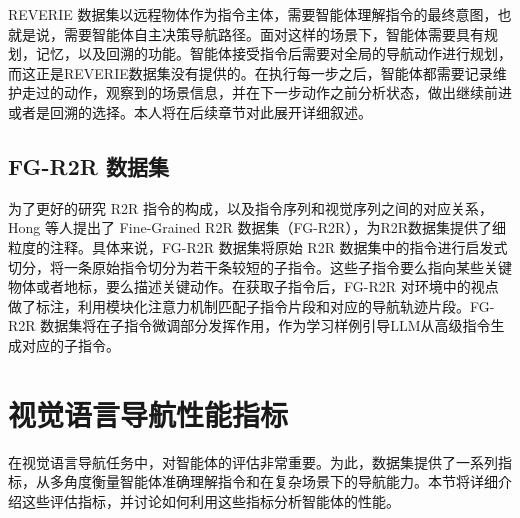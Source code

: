 \documentclass[bachelor]{thesis-uestc}
\begin{document}
REVERIE 数据集以远程物体作为指令主体，需要智能体理解指令的最终意图，也就是说，需要智能体自主决策导航路径。面对这样的场景下，智能体需要具有规划，记忆，以及回溯的功能。智能体接受指令后需要对全局的导航动作进行规划，而这正是REVERIE数据集没有提供的。在执行每一步之后，智能体都需要记录维护走过的动作，观察到的场景信息，并在下一步动作之前分析状态，做出继续前进或者是回溯的选择。本人将在后续章节对此展开详细叙述。

\subsection{FG-R2R 数据集}
为了更好的研究 R2R 指令的构成，以及指令序列和视觉序列之间的对应关系，Hong 等人提出了 Fine-Grained R2R 数据集（FG-R2R），为R2R数据集提供了细粒度的注释。具体来说，FG-R2R 数据集将原始 R2R 数据集中的指令进行启发式切分，将一条原始指令切分为若干条较短的子指令。这些子指令要么指向某些关键物体或者地标，要么描述关键动作。在获取子指令后，FG-R2R 对环境中的视点做了标注，利用模块化注意力机制匹配子指令片段和对应的导航轨迹片段。FG-R2R 数据集将在子指令微调部分发挥作用，作为学习样例引导LLM从高级指令生成对应的子指令。

\section{视觉语言导航性能指标}

在视觉语言导航任务中，对智能体的评估非常重要。为此，数据集提供了一系列指标，从多角度衡量智能体准确理解指令和在复杂场景下的导航能力。本节将详细介绍这些评估指标，并讨论如何利用这些指标分析智能体的性能。
\end{document}

